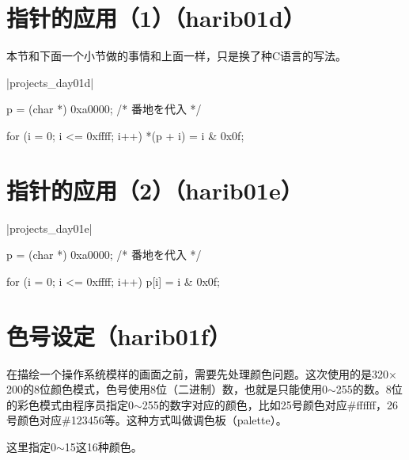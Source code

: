 \section{	指针的应用（1）（harib01d）	}
本节和下面一个小节做的事情和上面一样，只是换了种C语言的写法。

\dag|projects_day\harib01d|
\begin{code}[label=bootpack.c]
    p = (char *) 0xa0000; /* 番地を代入 */

	for (i = 0; i <= 0xffff; i++) {
		*(p + i) = i & 0x0f;
	}

\end{code}
\section{	指针的应用（2）（harib01e）	}
\dag|projects_day\harib01e|
\begin{code}[label=bootpack.c]
	p = (char *) 0xa0000; /* 番地を代入 */

	for (i = 0; i <= 0xffff; i++) {
		p[i] = i & 0x0f;
	}
\end{code}
\section{	色号设定（harib01f）	}
在描绘一个操作系统模样的画面之前，需要先处理颜色问题。这次使用的是320$\times$200的8位颜色模式，色号使用8位（二进制）数，也就是只能使用0$\sim$255的数。8位的彩色模式由程序员指定0$\sim$255的数字对应的颜色，比如25号颜色对应\#ffffff，26号颜色对应\#123456等。这种方式叫做调色板（palette）。

这里指定0$\sim$15这16种颜色。

